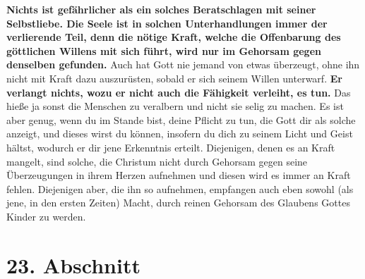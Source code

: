 \label{ref:04_22_vernunft_und_ego}
\textbf{Nichts ist gefährlicher als ein solches Beratschlagen mit seiner
Selbstliebe.
Die Seele ist in solchen Unterhandlungen immer der verlierende Teil,
denn die
nötige Kraft, welche die Offenbarung des göttlichen Willens mit sich führt,
wird nur im Gehorsam gegen denselben gefunden.} Auch hat Gott nie jemand von
etwas überzeugt, ohne ihn nicht mit Kraft dazu auszurüsten, sobald er sich
seinem Willen unterwarf. \textbf{Er verlangt nichts, wozu er nicht auch die
Fähigkeit
verleiht, es tun.} Das hieße ja sonst die Menschen zu
veralbern und
nicht sie
selig zu machen. Es ist aber genug, wenn du im Stande bist, deine Pflicht zu
tun, die Gott dir als solche anzeigt, und dieses wirst du können, insofern du
dich zu seinem Licht und Geist hältst, wodurch er dir jene Erkenntnis
erteilt. Diejenigen, denen es an Kraft mangelt, sind solche, die Christum nicht
durch Gehorsam gegen seine Überzeugungen in ihrem Herzen aufnehmen und diesen
wird es immer an Kraft fehlen. Diejenigen aber, die ihn so aufnehmen, empfangen
auch eben sowohl (als jene, in den ersten Zeiten) Macht, durch reinen Gehorsam
des Glaubens Gottes Kinder zu werden.

\section{23. Abschnitt} \label{kap4_ab23}

